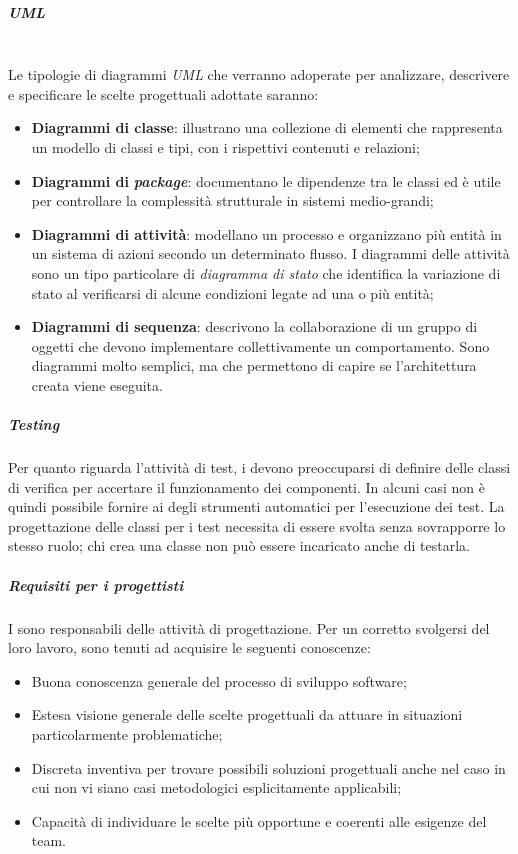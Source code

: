 	\subparagraph{UML}
	~\\Le tipologie di diagrammi \emph{UML} che verranno adoperate per analizzare, descrivere e specificare le scelte progettuali adottate saranno:
	\begin{itemize}
		\item \textbf{Diagrammi di classe}: illustrano una collezione di elementi che rappresenta un modello di classi e tipi, con i rispettivi contenuti e relazioni;
		\item \textbf{Diagrammi di } \emph{\textbf{package}}: documentano le dipendenze tra le classi ed è utile per controllare la complessità strutturale in sistemi medio-grandi;
		\item \textbf{Diagrammi di attività}: modellano un processo e organizzano più entità in un sistema di azioni secondo un determinato flusso. I diagrammi delle attività sono un tipo particolare di \emph{diagramma di stato} che identifica la variazione di stato al verificarsi di alcune condizioni legate ad una o più entità;
		\item \textbf{Diagrammi di sequenza}: descrivono la collaborazione di un gruppo di oggetti che devono implementare collettivamente un comportamento. Sono diagrammi molto semplici, ma che permettono di capire se l'architettura creata viene eseguita.
	\end{itemize}

	\subparagraph{Testing}
	Per quanto riguarda l’attività di test, i \progs{} devono preoccuparsi di definire delle classi di verifica per accertare il funzionamento dei componenti. In alcuni casi non è quindi possibile fornire ai \vers{} degli strumenti automatici per l'esecuzione dei test. La progettazione delle classi per i test necessita di essere svolta senza sovrapporre lo stesso ruolo; chi crea una classe non può essere incaricato anche di testarla.
	
	
	\subparagraph{Requisiti per i progettisti}
	I \progs{} sono responsabili delle attività di progettazione. Per un corretto svolgersi del loro lavoro, sono tenuti ad acquisire le seguenti conoscenze:
	\begin{itemize}
		\item Buona conoscenza generale del processo di sviluppo software;
		\item Estesa visione generale delle scelte progettuali da attuare in situazioni particolarmente problematiche;
		\item Discreta inventiva per trovare possibili soluzioni progettuali anche nel caso in cui non vi siano casi metodologici esplicitamente applicabili;
		\item Capacità di individuare le scelte più opportune e coerenti alle esigenze del team.
	\end{itemize}

